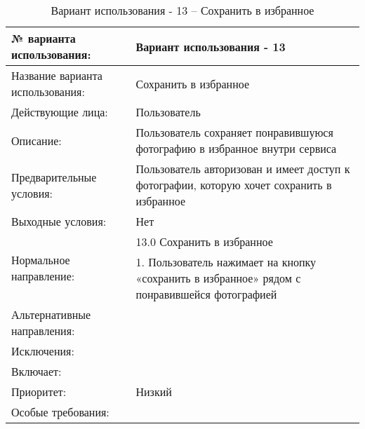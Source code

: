 \begin{table}[H]
  \caption{\onehalfspacing Вариант использования - 13 – Сохранить в избранное}\label{use-case-13-table}
  \begin{tabular}{|p{6cm}|p{10cm}|}
  \hline № варианта использования: & Вариант использования - 13 \\
  \hline Название варианта использования: & Сохранить в избранное \\
  \hline Действующие лица: & Пользователь \\
  \hline Описание: & Пользователь сохраняет понравившуюся фотографию в избранное внутри сервиса \\
  \hline Предварительные условия: & Пользователь авторизован и имеет доступ к фотографии, которую хочет сохранить в избранное \\
  \hline Выходные условия: & Нет \\
  \hline \multirow{2}{*}{Нормальное направление:} & 13.0 Сохранить в избранное \\
  \cline{2-2} & 1. Пользователь нажимает на кнопку «сохранить в избранное» рядом с понравившейся фотографией \\
  \hline Альтернативные направления: &  \\
  \hline Исключения: &  \\
  \hline Включает: &  \\
  \hline Приоритет: & Низкий \\
  \hline Особые требования: &  \\
  \hline 
  \end{tabular}
\end{table}

